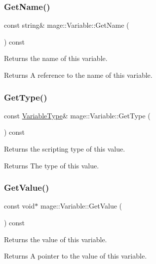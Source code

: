 \subsubsection{\texorpdfstring{Get\+Name()}{GetName()}}
{\footnotesize\ttfamily const string\& mage\+::\+Variable\+::\+Get\+Name (\begin{DoxyParamCaption}{ }\end{DoxyParamCaption}) const}

Returns the name of this variable.

\begin{DoxyReturn}{Returns}
A reference to the name of this variable. 
\end{DoxyReturn}
\hypertarget{structmage_1_1_variable_a5265e80b2a1c280fad5886174dfc997a}{}\label{structmage_1_1_variable_a5265e80b2a1c280fad5886174dfc997a} 
\subsubsection{\texorpdfstring{Get\+Type()}{GetType()}}
{\footnotesize\ttfamily const \hyperlink{namespacemage_a530428e73bac0ba7fe84b29086a9e33a}{Variable\+Type}\& mage\+::\+Variable\+::\+Get\+Type (\begin{DoxyParamCaption}{ }\end{DoxyParamCaption}) const}

Returns the scripting type of this value.

\begin{DoxyReturn}{Returns}
The type of this value. 
\end{DoxyReturn}
\hypertarget{structmage_1_1_variable_a65ecc95bcdc26733394d3a32d3d698f1}{}\label{structmage_1_1_variable_a65ecc95bcdc26733394d3a32d3d698f1} 
\subsubsection{\texorpdfstring{Get\+Value()}{GetValue()}}
{\footnotesize\ttfamily const void$\ast$ mage\+::\+Variable\+::\+Get\+Value (\begin{DoxyParamCaption}{ }\end{DoxyParamCaption}) const}

Returns the value of this variable.

\begin{DoxyReturn}{Returns}
A pointer to the value of this variable. 
\end{DoxyReturn}
\hypertarget{structmage_1_1_variable_a7983cd74a25e3998abac8d89245d1fd9}{}\label{structmage_1_1_variable_a7983cd74a25e3998abac8d89245d1fd9} 
